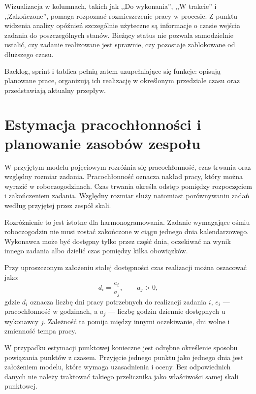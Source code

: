 Wizualizacja w kolumnach, takich jak ,,Do wykonania'', ,,W trakcie'' i ,,Zakończone'', pomaga rozpoznać rozmieszczenie pracy w procesie. Z punktu widzenia analizy opóźnień szczególnie użyteczne są informacje o czasie wejścia zadania do poszczególnych stanów. Bieżący status nie pozwala samodzielnie ustalić, czy zadanie realizowane jest sprawnie, czy pozostaje zablokowane od dłuższego czasu.

Backlog, sprint i tablica pełnią zatem uzupełniające się funkcje: opisują planowane prace, organizują ich realizację w określonym przedziale czasu oraz przedstawiają aktualny przepływ.


\section{Estymacja pracochłonności i planowanie zasobów zespołu}
\label{sec:estymacja-pracochlonnosci}

W przyjętym modelu pojęciowym rozróżnia się pracochłonność, czas trwania oraz względny rozmiar zadania. Pracochłonność oznacza nakład pracy, który można wyrazić w roboczogodzinach. Czas trwania określa odstęp pomiędzy rozpoczęciem i zakończeniem zadania. Względny rozmiar służy natomiast porównywaniu zadań według przyjętej przez zespół skali.

Rozróżnienie to jest istotne dla harmonogramowania. Zadanie wymagające ośmiu roboczogodzin nie musi zostać zakończone w ciągu jednego dnia kalendarzowego. Wykonawca może być dostępny tylko przez część dnia, oczekiwać na wynik innego zadania albo dzielić czas pomiędzy kilka obowiązków.

Przy uproszczonym założeniu stałej dostępności czas realizacji można oszacować jako:
\begin{equation}
    d_i = \frac{e_i}{a_j},
    \qquad a_j > 0,
    \label{eq:czas-realizacji}
\end{equation}
gdzie \(d_i\) oznacza liczbę dni pracy potrzebnych do realizacji zadania \(i\), \(e_i\) --- pracochłonność w godzinach, a \(a_j\) --- liczbę godzin dziennie dostępnych u wykonawcy \(j\). Zależność ta pomija między innymi oczekiwanie, dni wolne i zmienność tempa pracy.

W przypadku estymacji punktowej konieczne jest odrębne określenie sposobu powiązania punktów z czasem. Przyjęcie jednego punktu jako jednego dnia jest założeniem modelu, które wymaga uzasadnienia i oceny. Bez odpowiednich danych nie należy traktować takiego przelicznika jako właściwości samej skali punktowej.

